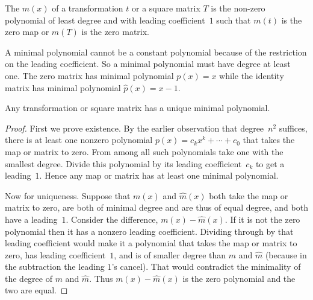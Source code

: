 \begin{definition}
The %
\( m(x) \) of a transformation \( t \)
or a square matrix \( T \) is the
non-zero polynomial of least degree and with leading coefficient~\( 1 \)
such that \( m(t) \) is the zero map or \( m(T) \) is the zero matrix.
\end{definition}

\noindent A minimal
polynomial cannot be a constant polynomial because 
of the restriction on the leading coefficient.
So a minimal
polynomial must have degree at least one.
The zero matrix has minimal polynomial $p(x)=x$ while the 
identity matrix has minimal polynomial $\hat{p}(x)=x-1$.

\begin{lemma}
Any transformation or square matrix has a unique minimal polynomial.  
\end{lemma}

\begin{proof}
First we prove existence.
By the earlier observation 
that degree~$n^2$ suffices, there is at least one 
nonzero polynomial $p(x)=c_kx^k+\cdots+c_0$ that
takes the map or matrix to zero.
From among all such polynomials
take one with the smallest degree.
Divide this polynomial by its leading coefficient~$c_k$ to get a leading~$1$.
Hence any map or matrix has at least one minimal polynomial.

Now for uniqueness.
Suppose that 
\( m(x) \) and \( \hat{m}(x) \) both take the map or matrix to zero,
are both of 
minimal degree and are thus of equal degree, 
and both have a leading~$1$.
Consider the difference, \( m(x)-\hat{m}(x) \).
If it is not the zero polynomial then it has a nonzero leading coefficient.
Dividing through by
that leading coefficient would make it a polynomial that takes
the map or matrix to zero, has leading 
coefficient~\( 1\), and is of 
smaller degree than $m$ and $\hat{m}$ 
(because in the subtraction the leading \( 1\)'s cancel).
That would contradict the minimality of the degree
of $m$ and $\hat{m}$. 
Thus \( m(x)-\hat{m}(x) \) is the zero polynomial and
the two are equal.
\end{proof}

